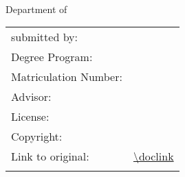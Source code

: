 \begin{titlepage}
	\begin{center}
		\huge{\sffamily\textbf{\doctitle}}\\[8ex] %
		\Large{\textbf{\docworktype}}\\[1.5ex] %
		\Large{\docinstitution}\\
		\Large{Department of \docdepartment}\\[11ex]
		\normalsize
		\begin{table}[H]
			\centering
			\begin{tabular}{ll}
				submitted by:  & \quad \docauthor\\[1.2ex]
				Degree Program: & \quad \docdegreeprogramm\\[1.2ex]
				Matriculation Number: & \quad \docmatriculationnumber\\[1.2ex]
				Advisor:  & \quad \docadvisor\\[8ex] %
				License:  & \quad \doclicense\\[1.2ex]
				Copyright:  & \quad \doccopyright\\[1.2ex]
				Link to original:  & \quad \url{\doclink}\\[1.2ex]
				\\[26ex]
			\end{tabular}
		\end{table}
		\docdate %
	\end{center}
\end{titlepage}
%